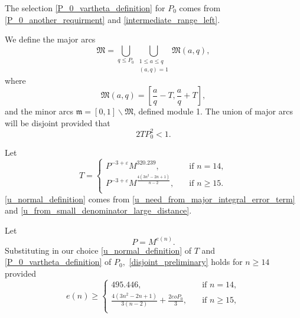 \documentclass[12pt]{amsart}
\theoremstyle{definition}
\numberwithin{equation}{section}
\begin{document}
The selection \eqref{P_0_vartheta_definition} for $P_0$ comes from \eqref{P_0_another_requirment} and \eqref{intermediate_range_left}. 

We define the major arcs
\begin{equation*}
    \mathfrak{M}=\bigcup\limits_{q\leq P_0}\bigcup_{\substack{1\leq a\leq q\\[3pt](a,q)=1}}\mathfrak{M}(a,q),
\end{equation*}
where
\begin{equation*}
    \mathfrak{M}(a,q)=\left[\frac{a}{q}-T,\frac{a}{q}+T\right],
\end{equation*}
and the minor arcs $\mathfrak{m}=[0,1] \backslash\mathfrak{M}$, defined module 1. The union of major arcs will be disjoint provided that
\begin{equation}
\label{disjoint_preliminary}
    2TP_0^2 < 1.
\end{equation}

Let 
\begin{equation}  %
    \label{u_normal_definition}
    T =
    \begin{cases}
        P^{-3+\varepsilon}M^{320.239}, \quad &\text{if } n =14,\\
        P^{-3+\varepsilon}M^{\frac{4(3n^2-2n+1)}{n-2}}, \quad &\text{if } n \geq 15.\\
    \end{cases}
\end{equation}
\eqref{u_normal_definition} comes from \eqref{u_need_from_major_integral_error_term} and \eqref{u_from_small_denominator_large_distance}.


Let
\begin{equation*}
    P=M^{e(n)}.
\end{equation*}
Substituting in our choice \eqref{u_normal_definition} of $T$ and \eqref{P_0_vartheta_definition} of $P_{0},$ \eqref{disjoint_preliminary} holds for $n \geq 14$ provided 
\begin{equation} %
    \label{major_arcs_disjoint_vartheta}
    e(n) \geq
    \begin{cases}
        495.446, \quad &\text{if } n =14,\\
       \frac{4(3n^2-2n+1)}{3(n-2)}+\frac{2eoP_0}{3}, \quad &\text{if } n \geq 15,\\
    \end{cases}
\end{equation}
\end{document}
